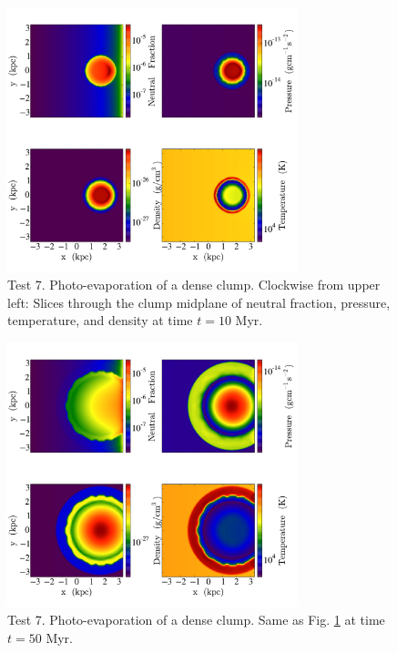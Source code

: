 \begin{figure}[t]
\centerline{\hfill
  \includegraphics[width=0.75\textwidth]{test7_slices_K.pdf}
  \hfill}
  \caption{Test 7. Photo-evaporation of a dense clump. Clockwise from upper left: Slices through the clump midplane of neutral fraction, pressure, temperature, and density at time $t=10$ Myr.}
  \label{fig:test7_slices_10}
\end{figure}

\begin{figure}[t]
\centerline{\hfill
  \includegraphics[width=0.75\textwidth]{test7_slices_K2.pdf}
  \hfill}
  \caption{Test 7. Photo-evaporation of a dense clump. Same as Fig. \ref{fig:test7_slices_10} at time $t=50$ Myr.}
  \label{fig:test7_slices_50}
\end{figure}

